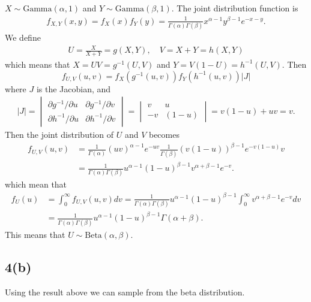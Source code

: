\documentclass[
]{article}
\begin{document}
\(X\sim\text{Gamma}(\alpha,1)\) and \(Y\sim\text{Gamma}(\beta,1)\). The
joint distribution function is \[
\begin{aligned}
  f_{X,Y}(x,y)=f_X(x)f_Y(y) = \frac{1}{\Gamma(\alpha)\Gamma(\beta)}x^{\alpha-1}y^{\beta-1}e^{-x-y}.
\end{aligned}
\] We define \[
\begin{aligned}
  U=\frac{X}{X+Y}=g(X,Y), \quad V=X+Y=h(X,Y)
\end{aligned}
\] which means that \(X=UV=g^{-1}(U,V)\) and \(Y=V(1-U)=h^{-1}(U,V)\).
Then \[
f_{U,V}(u,v)=f_X(g^{-1}(u,v))f_Y(h^{-1}(u,v))|J|
\] where \(J\) is the Jacobian, and \[
\begin{aligned}
  |J| = \begin{vmatrix}
    \partial g^{-1}/\partial u & \partial g^{-1}/\partial v \\
    \partial h^{-1}/\partial u & \partial h^{-1}/\partial v
  \end{vmatrix}  = \begin{vmatrix}
    v & u \\
    -v &(1-u)
  \end{vmatrix} = v(1-u) + uv = v.
\end{aligned}
\] Then the joint distribution of \(U\) and \(V\) becomes \[
\begin{aligned}
  f_{U,V}(u,v)&=\frac{1}{\Gamma(\alpha)}(uv)^{\alpha-1}e^{-uv}\frac{1}{\Gamma(\beta)}(v(1-u))^{\beta-1}e^{-v(1-u)}v \\
  &= \frac{1}{\Gamma(\alpha)\Gamma(\beta)}u^{\alpha-1}(1-u)^{\beta-1}v^{\alpha+\beta-1}e^{-v}.
\end{aligned}
\] which mean that \[
\begin{aligned}
  f_U(u)&=\int_0^\infty f_{U,V}(u,v)dv = \frac{1}{\Gamma(\alpha)\Gamma(\beta)}u^{\alpha-1}(1-u)^{\beta-1}\int_0^\infty v^{\alpha+\beta-1}e^{-v}dv \\
  &= \frac{1}{\Gamma(\alpha)\Gamma(\beta)}u^{\alpha-1}(1-u)^{\beta-1} \Gamma(\alpha+\beta).
\end{aligned}
\] This means that \(U\sim\text{Beta}(\alpha,\beta)\).

\hypertarget{b-1}{%
\subsection{4(b)}\label{b-1}}

Using the result above we can sample from the beta distribution.
\end{document}
